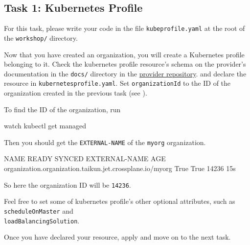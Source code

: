 \subsection{Task 1: Kubernetes Profile}\label{sec:kubeprofile}

\begin{note}
For this task, please write your code in the file \texttt{kubeprofile.yaml}
at the root of the \texttt{workshop/} directory.
\end{note}

Now that you have created an organization,
you will create a Kubernetes profile belonging to it.
Check the kubernetes profile resource's schema on
the provider's documentation in the \texttt{docs/} directory in the 
\href{https://github.com/itera-io/provider-jet-taikun/}{provider repository}.
and declare the resource in \texttt{kubernetesprofile.yaml}.
Set \texttt{organizationId} to the ID of the organization created in the previous task (see ).


\begin{tip}
To find the ID of the organization, run
\begin{shell}
watch kubectl get managed
\end{shell}
Then you should get the \texttt{EXTERNAL-NAME} of the \texttt{myorg} organization.
\begin{raw}
NAME                                                      READY SYNCED EXTERNAL-NAME AGE
organization.organization.taikun.jet.crossplane.io/myorg  True  True   14236         15s
\end{raw}
So here the organization ID will be \texttt{14236}.
\end{tip}

Feel free to set some of kubernetes profile's other optional attributes,
such as \texttt{scheduleOnMaster} and \\ \texttt{loadBalancingSolution}.


Once you have declared your resource, apply and move on to the next task.
